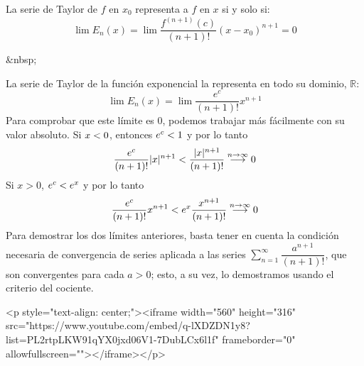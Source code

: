 \begin{teorema}
La serie de Taylor de $f$ en $x_0$
representa a $f$ en $x$ si y solo si:
\[
\lim E_n(x)=
\lim \dfrac{f^{(n+1)}(c)}{(n+1)!}(x-x_0)^{n+1}=0
\]
\end{teorema}
\begin{rawhtml}
&nbsp;
\end{rawhtml}
\begin{ejemplo}\label{ej:serieexp}
La serie de Taylor de la función exponencial la representa en todo su dominio, $\mathbb{R}$:
\[
\lim E_n(x)=
\lim \dfrac{e^c}{(n+1)!}x^{n+1}
\]
Para comprobar que este límite es 0, podemos trabajar más fácilmente con su valor absoluto.
Si $x< 0$, entonces $e^c< 1$ y por lo tanto
\[
\dfrac{e^c}{(n+1)!}|x|^{n+1} < \dfrac{|x|^{n+1}}{(n+1)!} \stackrel{n\to\infty}{\longrightarrow} 0
\]
Si $x>0$, $e^c< e^x$ y por lo tanto
\[
\dfrac{e^c}{(n+1)!}x^{n+1} < e^x\dfrac{x^{n+1}}{(n+1)!} \stackrel{n\to\infty}{\longrightarrow} 0
\]
Para demostrar los dos límites anteriores, basta tener en cuenta la condición necesaria de convergencia de series aplicada a las series $\displaystyle\sum_{n=1}^\infty  \dfrac{a^{n+1}}{(n+1)!}$, que son convergentes para cada $a>0$; esto, a su vez, lo demostramos usando el criterio del cociente.
\fej
\end{ejemplo}
\begin{rawhtml}
<p style="text-align: center;"><iframe width="560" height="316" src="https://www.youtube.com/embed/q-lXDZDN1y8?list=PL2rtpLKW91qYX0jxd06V1-7DubLCx6l1f" frameborder="0" allowfullscreen=""></iframe></p>
\end{rawhtml}
